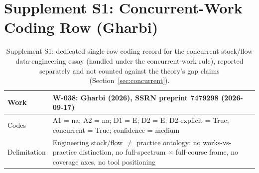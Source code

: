 \documentclass[10pt]{article}
\begin{document}
\section{Supplement S1: Concurrent-Work Coding Row (Gharbi)}\label{sec:appendix-gharbi}

\begin{table}[h]
\centering
\caption{Supplement S1: dedicated single-row coding record for the concurrent stock/flow data-engineering essay (handled under the concurrent-work rule), reported separately and not counted against the theory's gap claims (Section~\ref{sec:concurrent}).}
\label{tab:gharbi}
\small
\begin{tabular}{p{}p{}}
\toprule
Work & W-038: Gharbi (2026), SSRN preprint 7479298 (2026-09-17) \\
\midrule
Codes & A1 = na; A2 = na; D1 = E; D2 = E; D2-explicit = True; concurrent = True; confidence = medium \\
Delimitation & Engineering stock/flow $\neq$ practice ontology: no works-vs-practice distinction, no full-spectrum $\times$ full-course frame, no coverage axes, no tool positioning \\
\bottomrule
\end{tabular}
\end{table}



\end{document}
